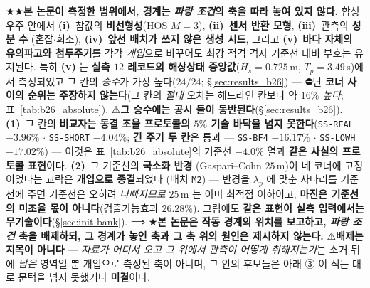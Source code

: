 \documentclass[11pt]{report}
\numberwithin{equation}{chapter}
\numberwithin{figure}{chapter}
\numberwithin{table}{chapter}
\begin{document}
★★\textbf{본 논문이 측정한 범위에서, 경계는 \emph{파랑 조건}의 축을 따라 놓여 있지
않다.} 합성 우주 안에서 \textbf{(i)}~참값의 \textbf{비선형성}(HOS $M{=}3$),
\textbf{(ii)}~\textbf{센서 반환 모형}, \textbf{(iii)}~관측의 \textbf{성분 수}
(혼잡$\cdot$희소), \textbf{(iv)}~\textbf{앞선 배치가 쓰지 않은 생성 시드}, 그리고
\textbf{(v)}~\textbf{바다 자체의 유의파고와 첨두주기}를 각각 \emph{개입}으로 바꾸어도
최강 적격 격자 기준선 대비 부호는 유지된다. 특히 \textbf{(v)} 는 \textbf{실측 $12$ 레코드의
해상상태 중앙값}($H_s = 0.725$\,m, $T_p = 3.49$\,s)에서 측정되었고 그 칸의 \emph{승수}가
가장 높다($24/24$; \S\ref{sec:results_b26}) --- ⛔단 \textbf{코너 사이의 순위는 주장하지
않는다}(그 칸의 \emph{절대} 오차는 헤드라인 칸보다 약 $16\%$ \emph{높다};
표~\ref{tab:b26_absolute}).
⚠\textbf{그 승수에는 공시 둘이 동반된다}(\S\ref{sec:results_b26}).
\textbf{(1)}~그 칸의 \textbf{비교자는 동결 조율 프로토콜의 $5\%$ 기술 바닥을 넘지
못한다}(\texttt{SS-REAL} $-3.96\%$ $\cdot$ \texttt{SS-SHORT} $-4.04\%$;
\textbf{긴 주기 두 칸}은 통과 --- \texttt{SS-BF4} $-16.17\%$ $\cdot$
\texttt{SS-LOWH} $-17.02\%$) --- 이것은 표~\ref{tab:b26_absolute}의 기준선 $-4.0\%$ 열과
\textbf{같은 사실의 프로토콜 표현}이다. \textbf{(2)}~그 기준선의 \textbf{국소화 반경}
(Gaspari--Cohn $25$\,m)이 네 코너에 고정이었다는 교락은 \textbf{개입으로 종결}되었다
(배치 \texttt{M2}) --- 반경을 $\lambda_p$ 에 맞춘 사다리를 기준선에 주면 기준선은 오히려
\emph{나빠지므로} $25$\,m 는 이미 최적점 이하이고, \textbf{마진은 기준선의 미조율 몫이
아니다}(검출가능효과 $26.28\%$).
그럼에도 \textbf{같은 표현이 실측 입력에서는
무기술이다}(\S\ref{sec:init-bank}). ⟹ ★\textbf{본 논문은 작동 경계의 위치를 보고하고,
\emph{파랑 조건} 축을 배제하되, 그 경계가 놓인 축과 그 축 위의 원인은 제시하지 않는다.}
⚠\textbf{배제는 지목이 아니다} --- \emph{자료가 어디서 오고 그 위에서 관측이 어떻게
취해지는가}는 소거 뒤에 \emph{남은} 영역일 뿐 개입으로 측정된 축이 아니며, 그 안의
후보들은 아래 ③ 이 적는 대로 문턱을 넘지 못했거나 \textbf{미결}이다.
\end{document}
